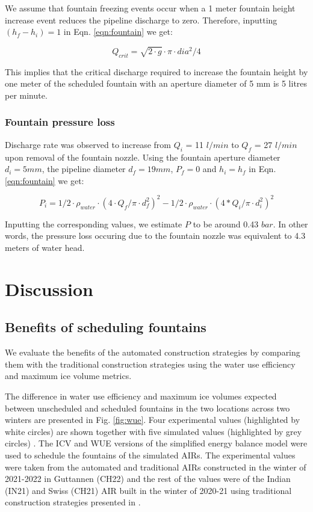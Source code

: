\documentclass[tc, manuscript]{copernicus}
\begin{document}
We assume that fountain freezing events occur when a 1 meter fountain height increase event reduces the pipeline
discharge to zero. Therefore, inputting $(h_f - h_i) = 1$ in Eqn. \ref{eqn:fountain} we get: 

\begin{equation}
  \label{eqn:fountain_min}
  Q_{crit} = \sqrt{2 \cdot g } \cdot \pi \cdot dia^2/4
\end{equation}

This implies that the critical discharge required to increase the fountain height by one meter of the scheduled
fountain with an aperture diameter of 5 mm is 5 litres per minute.


\subsubsection{Fountain pressure loss}

Discharge rate was observed to increase from $Q_{i}$ = 11 $l/min$ to $Q_{f}$ = 27 $l/min$ upon removal of the
fountain nozzle. Using the fountain aperture diameter $d_i = 5 mm$, the pipeline diameter $d_f = 19 mm$, $P_{f}
= 0$ and $h_{i} = h_{f}$ in Eqn. \ref{eqn:fountain} we get: 

\begin{equation}
  P_{i} = 1/2 \cdot \rho_{water} \cdot (4 \cdot Q_f/\pi \cdot d_f^2)^2 - 1/2 \cdot \rho_{water} \cdot (4 * Q_i/\pi \cdot d_i^2)^2
\end{equation}

Inputting the corresponding values, we estimate $P$ to be around 0.43 $bar$. In other words, the pressure loss
occuring due to the fountain nozzle was equivalent to 4.3 meters of water head.

\section{Discussion}

\subsection{Benefits of scheduling fountains}

We evaluate the benefits of the automated construction strategies by comparing them with the traditional
construction strategies using the water use efficiency and maximum ice volume metrics. 

The difference in water use efficiency and maximum ice volumes expected between unscheduled and scheduled
fountains in the two locations across two winters are presented in Fig. \ref{fig:wue}. Four experimental values
(highlighted by white circles) are shown together with five simulated values (highlighted by grey circles) . The
ICV and WUE versions of the simplified energy balance model were used to schedule the fountains of the simulated
AIRs. The experimental values were taken from the automated and traditional AIRs constructed in the winter of
2021-2022 in Guttannen (CH22) and the rest of the values were of the Indian (IN21) and Swiss (CH21) AIR built in
the winter of 2020-21 using traditional construction strategies presented in
\cite{balasubramanianInfluenceMeteorologicalConditions2022}. 
\end{document}
